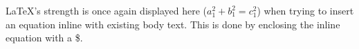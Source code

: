 LaTeX's strength is once again displayed here ($a_1^2 + b_1^2 = c_1^2$) when trying to insert an equation
inline with existing body text. This is done by enclosing the inline equation with a \$.